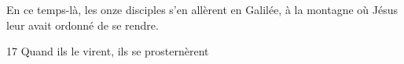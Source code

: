 En ce temps-là, les onze disciples s’en allèrent en Galilée, à la montagne où Jésus leur avait ordonné de se rendre.

17 Quand ils le virent, ils se prosternèrent